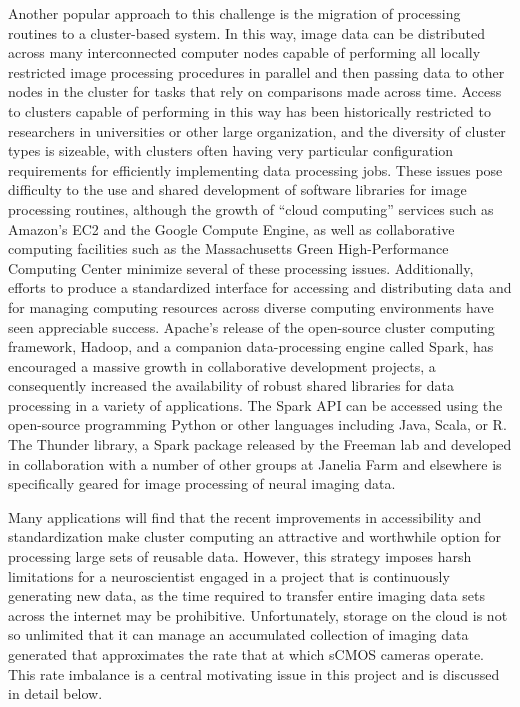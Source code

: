 \documentclass[
  12pt,
  lettersizepaper,
]{book}
\begin{document}
Another popular approach to this challenge is the migration of
processing routines to a cluster-based system. In this way, image data
can be distributed across many interconnected computer nodes capable of
performing all locally restricted image processing procedures in
parallel and then passing data to other nodes in the cluster for tasks
that rely on comparisons made across time. Access to clusters capable of
performing in this way has been historically restricted to researchers
in universities or other large organization, and the diversity of
cluster types is sizeable, with clusters often having very particular
configuration requirements for efficiently implementing data processing
jobs. These issues pose difficulty to the use and shared development of
software libraries for image processing routines, although the growth of
``cloud computing'' services such as Amazon's EC2 and the Google Compute
Engine, as well as collaborative computing facilities such as the
Massachusetts Green High-Performance Computing Center minimize several
of these processing issues. Additionally, efforts to produce a
standardized interface for accessing and distributing data and for
managing computing resources across diverse computing environments have
seen appreciable success. Apache's release of the open-source cluster
computing framework, Hadoop, and a companion data-processing engine
called Spark, has encouraged a massive growth in collaborative
development projects, a consequently increased the availability of
robust shared libraries for data processing in a variety of
applications. The Spark API can be accessed using the open-source
programming Python or other languages including Java, Scala, or R. The
Thunder library, a Spark package released by the Freeman lab and
developed in collaboration with a number of other groups at Janelia Farm
and elsewhere is specifically geared for image processing of neural
imaging data.

Many applications will find that the recent improvements in
accessibility and standardization make cluster computing an attractive
and worthwhile option for processing large sets of reusable data.
However, this strategy imposes harsh limitations for a neuroscientist
engaged in a project that is continuously generating new data, as the
time required to transfer entire imaging data sets across the internet
may be prohibitive. Unfortunately, storage on the cloud is not so
unlimited that it can manage an accumulated collection of imaging data
generated that approximates the rate that at which sCMOS cameras
operate. This rate imbalance is a central motivating issue in this
project and is discussed in detail below.
\end{document}

